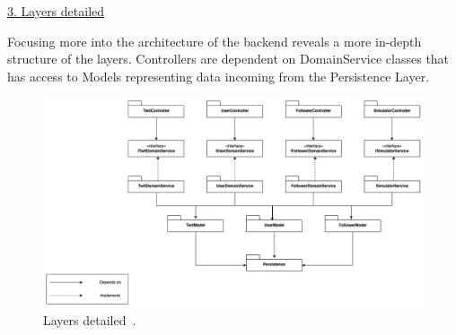 \newpage
\underline{3. Layers detailed}
\vspace{3mm}

Focusing more into the architecture of the backend reveals a more in-depth structure of the layers. Controllers are dependent on DomainService classes that has access to Models representing data incoming from the Persistence Layer.

\begin{figure}[h!]
    \centering
    \includegraphics[width=\linewidth,height=\textheight,keepaspectratio]{images/architectural_views/minitwit_module_view_backend_layers_detailed.png}
    \caption{Layers detailed~\cite{moduleViewLayersDetailed}.}
    \label{fig:modulebackenddetail}
\end{figure}